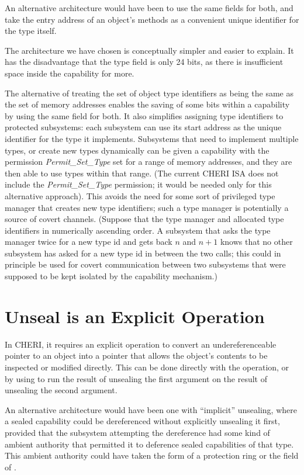 An alternative architecture would have been to use the same fields for
both, and take the entry address of an object's methods as a convenient
unique identifier for the type itself.

The architecture we have chosen is conceptually simpler and easier to
explain. It has the disadvantage that the type field is only 24 bits,
as there is insufficient space inside the capability for more.

The alternative of treating the set of object type identifiers as being the
same as the set of memory addresses enables the saving of some bits within
a capability by using the same field for both.
It also simplifies
assigning type identifiers to protected subsystems: each subsystem can
use its start address as the unique identifier for the type it implements.
Subsystems that need to implement multiple types, or create new types
dynamically can be given a capability with the permission
\emph{Permit\_Set\_Type} set for a
range of memory addresses, and they are then able to use types within that
range. (The current CHERI ISA does not include the
\emph{Permit\_Set\_Type} permission;
it would be needed only for this alternative approach). This avoids the need
for some sort of privileged type manager that
creates new type identifiers; such a type manager is potentially a source
of covert channels. (Suppose that the type manager and allocated
type identifiers in numerically ascending order. A subsystem that asks the
type manager twice for a new type id and gets back $n$ and $n+1$ knows that no
other subsystem has asked for a new type id in between the two calls; this
could in principle be used for covert communication between two subsystems
that were supposed to be kept isolated by the capability mechanism.)

\section{Unseal is an Explicit Operation}

In CHERI, it requires an explicit operation to
convert an undereferenceable  pointer to an object into a pointer that
allows the object's contents to be inspected or modified directly.
This can be done directly with the  operation,
or by using  to run the result of unsealing the first
argument on the result of unsealing the second argument.

An alternative architecture would have been one with ``implicit'' unsealing,
where a sealed capability could be dereferenced without
explicitly unsealing it first, provided that the subsystem attempting the
dereference had some kind of ambient authority that permitted it to deference
sealed capabilities of that type. This ambient authority could have taken
the form of a protection ring or the \cotype{} field of \PCC{}.

